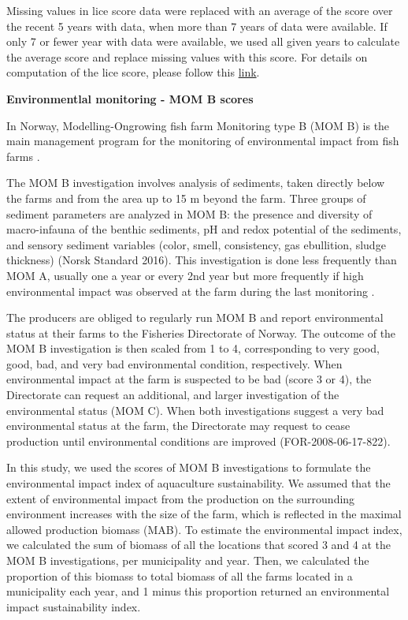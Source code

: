 \documentclass[
]{book}
\begin{document}
Missing values in lice score data were replaced with an average of the score over the recent 5 years with data, when more than 7 years of data were available. If only 7 or fewer year with data were available, we used all given years to calculate the average score and replace missing values with this score.
For details on computation of the lice score, please follow this \href{https://ohi-norway.github.io/nor-prep/prep/food_provision/Mariculture/lice_count_at_localities.html}{link}.

\textbf{Environmentlal monitoring - MOM B scores}

In Norway, Modelling-Ongrowing fish farm Monitoring type B (MOM B) is the main management program for the monitoring of environmental impact from fish farms \citep{ervik1997regulating}.

The MOM B investigation involves analysis of sediments, taken directly below the farms and from the area up to 15 m beyond the farm. Three groups of sediment parameters are analyzed in MOM B: the presence and diversity of macro-infauna of the benthic sediments, pH and redox potential of the sediments, and sensory sediment variables (color, smell, consistency, gas ebullition, sludge thickness) (Norsk Standard 2016). This investigation is done less frequently than MOM A, usually one a year or every 2nd year but more frequently if high environmental impact was observed at the farm during the last monitoring \citep{norge2016miljoovervaaking}.

The producers are obliged to regularly run MOM B and report environmental status at their farms to the Fisheries Directorate of Norway. The outcome of the MOM B investigation is then scaled from 1 to 4, corresponding to very good, good, bad, and very bad environmental condition, respectively. When environmental impact at the farm is suspected to be bad (score 3 or 4), the Directorate can request an additional, and larger investigation of the environmental status (MOM C). When both investigations suggest a very bad environmental status at the farm, the Directorate may request to cease production until environmental conditions are improved (FOR-2008-06-17-822).

In this study, we used the scores of MOM B investigations to formulate the environmental impact index of aquaculture sustainability. We assumed that the extent of environmental impact from the production on the surrounding environment increases with the size of the farm, which is reflected in the maximal allowed production biomass (MAB). To estimate the environmental impact index, we calculated the sum of biomass of all the locations that scored 3 and 4 at the MOM B investigations, per municipality and year. Then, we calculated the proportion of this biomass to total biomass of all the farms located in a municipality each year, and 1 minus this proportion returned an environmental impact sustainability index.
\end{document}
